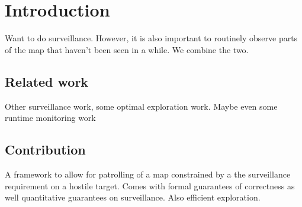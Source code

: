 \section{Introduction}

Want to do surveillance. However, it is also important to routinely observe parts of the map that haven't been seen in a while. We combine the two. 

\subsection{Related work}
Other surveillance work, some optimal exploration work. Maybe even some runtime monitoring work


\subsection{Contribution}
A framework to allow for patrolling of a map constrained by a the surveillance requirement on a hostile target. Comes with formal guarantees of correctness as well quantitative guarantees on surveillance. Also efficient exploration. 